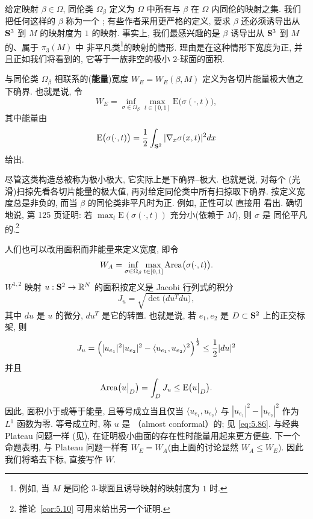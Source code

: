 给定映射 $\beta\in\Omega$, 同伦类 $\Omega_\beta$ 定义为 $\Omega$ 中所有与
$\beta$ 在 $\Omega$ 内同伦的映射之集. 我们把任何这样的 $\beta$ 称为一个
; 有些作者采用更严格的定义, 要求
$\beta$ 还必须诱导出从 $\mathbf{S}^3$ 到 $M$ 的映射度为 $1$ 的映射. 事实上,
我们最感兴趣的是 $\beta$ 诱导出从 $\mathbf{S}^3$ 到 $M$ 的、属于 $\pi_3(M)$ 中
非平凡类\footnote{例如, 当 $M$ 是同伦 $3$-球面且诱导映射的映射度为 $1$
时.}的映射的情形. 理由是在这种情形下宽度为正, 并且正如我们将看到的,
它等于一族非空的极小 $2$-球面的面积.

与同伦类 $\Omega_\beta$ 相联系的(\textbf{能量})宽度
$W_E=W_E(\beta,M)$ 定义为各切片能量极大值之下确界. 也就是说, 令
\begin{equation}
W_E=\inf_{\sigma\in\Omega_\beta}\max_{t\in[0,1]}
\mathrm{E}\bigl(\sigma(\cdot,t)\bigr),
\label{eq:5.81}
\end{equation}
其中能量由
\begin{equation}
\mathrm{E}\bigl(\sigma(\cdot,t)\bigr)
=\frac12\int_{\mathbf{S}^2}|\nabla_x\sigma(x,t)|^2dx
\label{eq:5.82}
\end{equation}
给出.

尽管这类构造总被称为极小极大, 它实际上是下确界--极大. 也就是说, 对每个
(光滑)扫掠先看各切片能量的极大值, 再对给定同伦类中所有扫掠取下确界.
按定义宽度总是非负的, 而当 $\beta$ 的同伦类非平凡时为正. 例如, 正性可以
直接用 \cite{Jo} 看出. 确切地说, \cite{Jo} 第 125 页证明: 若
$\max_t\mathrm{E}(\sigma(\cdot,t))$ 充分小(依赖于 $M$), 则 $\sigma$ 是
同伦平凡的.\footnote{推论~\ref{cor:5.10} 可用来给出另一个证明.}

人们也可以改用面积而非能量来定义宽度, 即令
\begin{equation}
W_A=\inf_{\sigma\in\Omega_\beta}\max_{t\in[0,1]}
\operatorname{Area}\bigl(\sigma(\cdot,t)\bigr).
\label{eq:5.83}
\end{equation}
$W^{1,2}$ 映射 $u:\mathbf{S}^2\to\mathbb{R}^N$ 的面积按定义是 Jacobi 行列式的积分
\begin{equation}
J_u=\sqrt{\det\bigl(du^Tdu\bigr)},
\label{eq:5.84}
\end{equation}
其中 $du$ 是 $u$ 的微分, $du^T$ 是它的转置. 也就是说, 若 $e_1,e_2$ 是
$D\subset\mathbf{S}^2$ 上的正交标架, 则
\begin{equation}
J_u=\Bigl(|u_{e_1}|^2|u_{e_2}|^2-\langle u_{e_1},u_{e_2}\rangle^2
\Bigr)^{\frac12}\leq\frac12|du|^2
\label{eq:5.85}
\end{equation}
并且
\begin{equation}
\operatorname{Area}\bigl(u\big|_D\bigr)=\int_DJ_u\leq\mathrm{E}\bigl(u\big|_D\bigr).
\label{eq:5.86}
\end{equation}
因此, 面积小于或等于能量, 且等号成立当且仅当
$\langle u_{e_1},u_{e_2}\rangle$ 与 $|u_{e_1}|^2-|u_{e_2}|^2$ 作为
$L^1$ 函数为零. 等号成立时, 称 $u$ 是%
（almost conformal）的; 见 \eqref{eq:5.86}. 与经典 Plateau 问题一样
(见), 在证明极小曲面的存在性时能量用起来更方便些.
下一个命题表明, 与 Plateau 问题一样有 $W_E=W_A$(由上面的讨论显然
$W_A\leq W_E$). 因此我们将略去下标, 直接写作 $W$.

